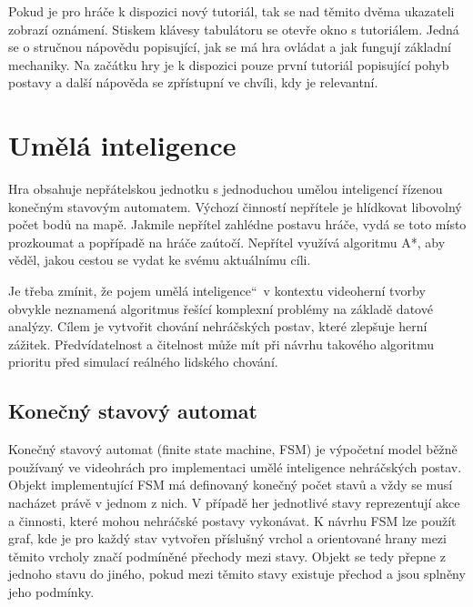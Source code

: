 \documentclass[FM,Proj]{tulthesis}
\begin{document}
	Pokud je pro hráče k dispozici nový tutoriál, tak se nad těmito dvěma ukazateli zobrazí oznámení. Stiskem klávesy tabulátoru se otevře okno s tutoriálem. Jedná se o stručnou nápovědu popisující, jak se má hra ovládat a jak fungují základní mechaniky. Na začátku hry je k dispozici pouze první tutoriál popisující pohyb postavy a další nápověda se zpřístupní ve chvíli, kdy je relevantní.
	
	\section{Umělá inteligence}	
	
	Hra obsahuje nepřátelskou jednotku s jednoduchou umělou inteligencí řízenou konečným stavovým automatem. Výchozí činností nepřítele je hlídkovat libovolný počet bodů na mapě. Jakmile nepřítel zahlédne postavu hráče, vydá se toto místo prozkoumat a popřípadě na hráče zaútočí. Nepřítel využívá algoritmu A*, aby věděl, jakou cestou se vydat ke svému aktuálnímu cíli.
	
	Je třeba zmínit, že pojem \quotedblbase umělá inteligence\textquotedblleft\ v kontextu videoherní tvorby obvykle neznamená algoritmus řešící komplexní problémy na základě datové analýzy. Cílem je vytvořit chování nehráčských postav, které zlepšuje herní zážitek. Předvídatelnost a čitelnost může mít při návrhu takového algoritmu prioritu před simulací reálného lidského chování.
	\cite{gameAI}
	
	\subsection{Konečný stavový automat}
	
	Konečný stavový automat (finite state machine, FSM) je výpočetní model běžně používaný ve videohrách pro implementaci umělé inteligence nehráčských postav. Objekt implementující FSM má definovaný konečný počet stavů a vždy se musí nacházet právě v jednom z nich. V případě her jednotlivé stavy reprezentují akce a činnosti, které mohou nehráčské postavy vykonávat. K návrhu FSM lze použít graf, kde je pro každý stav vytvořen příslušný vrchol a orientované hrany mezi těmito vrcholy značí podmíněné přechody mezi stavy. Objekt se tedy přepne z jednoho stavu do jiného, pokud mezi těmito stavy existuje přechod a jsou splněny jeho podmínky.
	\cite{lit1}
	
\end{document}
